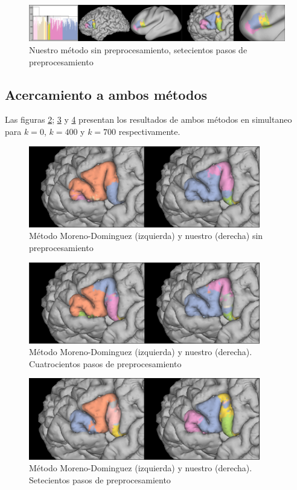 \begin{figure}[h!]
    \includegraphics[width=\textwidth]{img/broca/logit_750.png}
    \caption{Nuestro m\'etodo sin preprocesamiento, setecientos pasos de preprocesamiento}
    \label{fig:nuestro3}
\end{figure}

\clearpage

\subsection{Acercamiento a ambos m\'etodos}
\label{sec:acercamiento}

Las figuras \ref{fig:ambos0}; \ref{fig:ambos1} y \ref{fig:ambos2} presentan los
resultados de ambos m\'etodos en simultaneo para $k=0$, $k=400$ y $k=700$ respectivamente.

\begin{figure}[h!]
    \centering
    \includegraphics[width=0.9\textwidth]{img/broca/vs_0.png}
    \caption{M\'etodo Moreno-Dominguez (izquierda) y nuestro (derecha) sin preprocesamiento}
    \label{fig:ambos0}
\end{figure}

\begin{figure}[h!]
    \centering
    \includegraphics[width=0.9\textwidth]{img/broca/vs_400.png}
    \caption{M\'etodo Moreno-Dominguez (izquierda) y nuestro (derecha). Cuatrocientos pasos de preprocesamiento}
    \label{fig:ambos1}    
\end{figure}
    
\begin{figure}[h!]
    \centering
    \includegraphics[width=0.9\textwidth]{img/broca/vs_700.png}
    \caption{M\'etodo Moreno-Dominguez (izquierda) y nuestro (derecha). Setecientos pasos de preprocesamiento}
    \label{fig:ambos2}
\end{figure}

\clearpage
